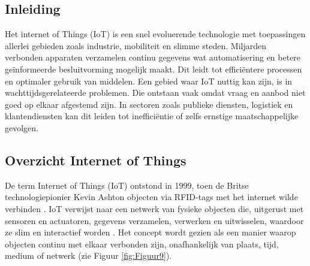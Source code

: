 

\subsection{Inleiding}
Het internet of Things (IoT) is een snel evoluerende technologie met toepassingen allerlei gebieden zoals industrie, mobiliteit en slimme steden. Miljarden verbonden apparaten verzamelen continu gegevens wat automatisering en betere geïnformeerde besluitvorming mogelijk maakt. Dit leidt tot efficiëntere processen en optimaler gebruik van middelen. Een gebied waar IoT nuttig kan zijn, is in wachttijdsgerelateerde problemen. Die ontstaan vaak omdat vraag en aanbod niet goed op elkaar afgestemd zijn. In sectoren zoals publieke diensten, logistiek en klantendiensten  kan dit leiden tot inefficiëntie of zelfs ernstige maatschappelijke gevolgen.

\subsection{Overzicht Internet of Things}
De term Internet of Things (IoT) ontstond in 1999, toen de Britse technologiepionier Kevin Ashton objecten via RFID-tags met het internet wilde verbinden \autocite{Bassi2013, Rejeb2023}. IoT verwijst naar een netwerk van fysieke objecten die, uitgerust met sensoren en actuatoren, gegevens verzamelen, verwerken en uitwisselen, waardoor ze slim en interactief worden \autocite{Elksasy2023}. Het concept wordt gezien als een manier waarop objecten continu met elkaar verbonden zijn, onafhankelijk van plaats, tijd, medium of netwerk (zie Figuur \ref{fig:Figuur9}).

